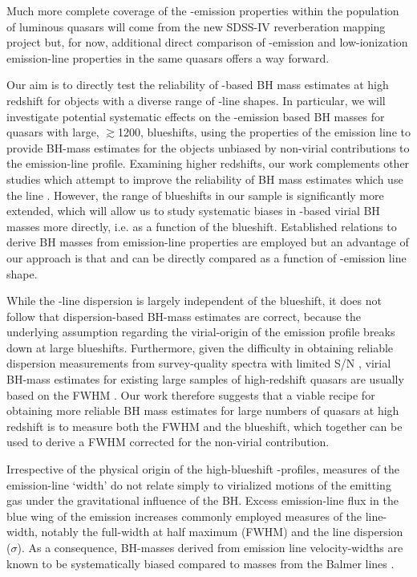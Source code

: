 Much more complete coverage of the -emission properties within the population of luminous quasars will come from the new SDSS-IV reverberation mapping project \citep{shen15} but, for now, additional direct comparison of -emission and low-ionization emission-line properties in the same quasars offers a way forward.




Our aim is to directly test the reliability of -based BH mass estimates at high redshift for objects with a diverse range of -line shapes.  
In particular, we will investigate potential systematic effects on the -emission based BH masses for quasars with large, $\gtrsim$1200\kms,  blueshifts, using the properties of the \ha emission line to provide BH-mass estimates for the objects unbiased by non-virial contributions to the emission-line profile.
Examining higher redshifts, our work complements other studies which attempt to improve the reliability of BH mass estimates which use the  line \citep[e.g.][]{runnoe13,denney12}. 
However, the range of  blueshifts in our sample is significantly more extended, which will allow us to study systematic biases in -based virial BH masses more directly, i.e. as a function of the  blueshift. 
Established relations to derive BH masses from emission-line properties are employed but an advantage of our approach is that  and \ha can be directly compared as a function of -emission line shape. 


While the -line dispersion is largely independent of the blueshift, it does not follow that dispersion-based BH-mass estimates are correct, because the underlying assumption regarding the virial-origin of the  emission profile breaks down at large blueshifts.
Furthermore, given the difficulty in obtaining reliable dispersion measurements from survey-quality spectra with limited S/N \citep[e.g.][]{mejia-restrepo16}, virial BH-mass estimates for existing large samples of high-redshift quasars are usually based on the FWHM \citep[e.g.][]{shen11}. 
Our work therefore suggests that a viable recipe for obtaining more reliable BH mass estimates for large numbers of quasars at high redshift is to measure both the FWHM and the blueshift, which together can be used to derive a FWHM corrected for the non-virial contribution. 




Irrespective of the physical origin of the high-blueshift -profiles, measures of the emission-line `width' do not relate simply to virialized motions of the emitting gas under the gravitational influence of the BH. 
Excess emission-line flux in the blue wing of the  emission increases commonly employed measures of the line-width, notably the full-width at half maximum (FWHM) and the line dispersion ($\sigma$). 
As a consequence, BH-masses derived from  emission line velocity-widths are known to be systematically biased compared to masses from the Balmer lines \citep[e.g.][]{shen08,shen12}. 





